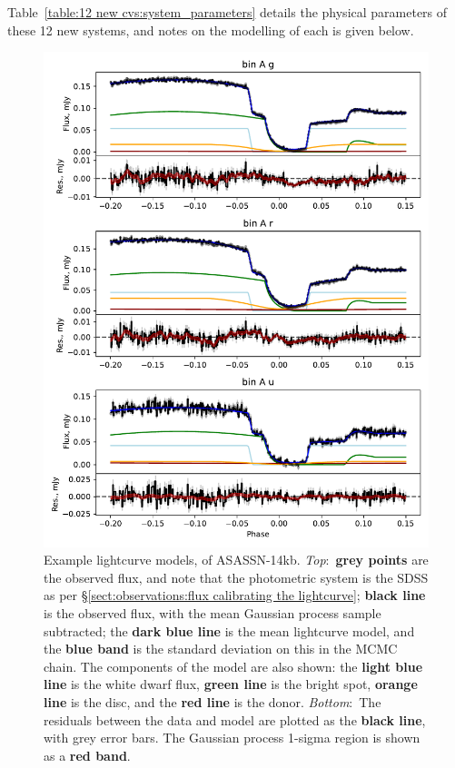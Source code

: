 Table~\ref{table:12 new cvs:system_parameters} details the physical parameters of these 12 new systems, and notes on the modelling of each is given below.

\begin{figure}
    \centering
    \includegraphics[width=\textwidth]{figures/results/ASASSN-14kb/ASASSN-14kb_ex_1.pdf}
    \caption{Example lightcurve models, of ASASSN-14kb. {\it Top}:~{\bf grey points} are the observed flux, and note that the photometric system is the SDSS as per \S\ref{sect:observations:flux calibrating the lightcurve}; {\bf black line} is the observed flux, with the mean Gaussian process sample subtracted; the {\bf dark blue line} is the mean lightcurve model, and the {\bf blue band} is the standard deviation on this in the MCMC chain. The components of the model are also shown: the {\bf light blue line} is the white dwarf flux, {\bf green line} is the bright spot, {\bf orange line} is the disc, and the {\bf red line} is the donor. {\it Bottom}:~The residuals between the data and model are plotted as the {\bf black line}, with grey error bars. The Gaussian process 1-sigma region is shown as a {\bf red band}.}
    \label{fig:results:12 new CVs:ASASSN-14kb all lightcurves}
\end{figure}
